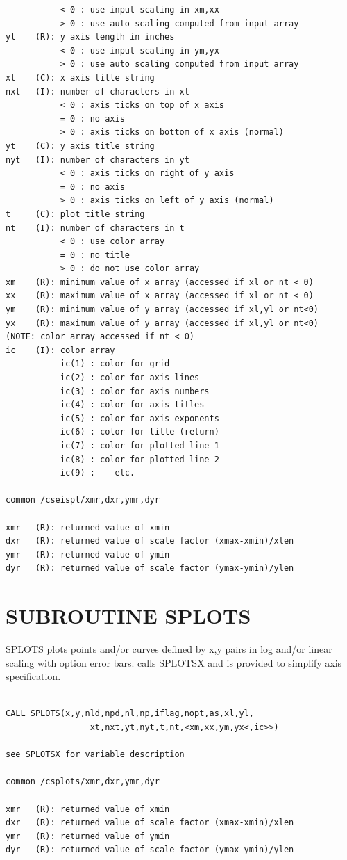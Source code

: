\documentclass[11pt]{report}
\begin{document}
\begin{verbatim}
           < 0 : use input scaling in xm,xx
           > 0 : use auto scaling computed from input array
yl    (R): y axis length in inches
           < 0 : use input scaling in ym,yx
           > 0 : use auto scaling computed from input array
xt    (C): x axis title string
nxt   (I): number of characters in xt
           < 0 : axis ticks on top of x axis
           = 0 : no axis
           > 0 : axis ticks on bottom of x axis (normal)
yt    (C): y axis title string
nyt   (I): number of characters in yt
           < 0 : axis ticks on right of y axis
           = 0 : no axis
           > 0 : axis ticks on left of y axis (normal)
t     (C): plot title string
nt    (I): number of characters in t
           < 0 : use color array
           = 0 : no title
           > 0 : do not use color array
xm    (R): minimum value of x array (accessed if xl or nt < 0)
xx    (R): maximum value of x array (accessed if xl or nt < 0)
ym    (R): minimum value of y array (accessed if xl,yl or nt<0)
yx    (R): maximum value of y array (accessed if xl,yl or nt<0)
(NOTE: color array accessed if nt < 0)
ic    (I): color array
           ic(1) : color for grid
           ic(2) : color for axis lines
           ic(3) : color for axis numbers
           ic(4) : color for axis titles
           ic(5) : color for axis exponents
           ic(6) : color for title (return)
           ic(7) : color for plotted line 1
           ic(8) : color for plotted line 2
           ic(9) :    etc.

common /cseispl/xmr,dxr,ymr,dyr

xmr   (R): returned value of xmin
dxr   (R): returned value of scale factor (xmax-xmin)/xlen
ymr   (R): returned value of ymin
dyr   (R): returned value of scale factor (ymax-ymin)/ylen
\end{verbatim}

\newpage
\section{SUBROUTINE SPLOTS}

SPLOTS plots points and/or curves defined by x,y pairs in log and/or
linear scaling with option error bars.
 calls SPLOTSX and is provided to simplify axis specification.
\begin{verbatim}

CALL SPLOTS(x,y,nld,npd,nl,np,iflag,nopt,as,xl,yl,
                 xt,nxt,yt,nyt,t,nt,<xm,xx,ym,yx<,ic>>)

see SPLOTSX for variable description

common /csplots/xmr,dxr,ymr,dyr

xmr   (R): returned value of xmin
dxr   (R): returned value of scale factor (xmax-xmin)/xlen
ymr   (R): returned value of ymin
dyr   (R): returned value of scale factor (ymax-ymin)/ylen
\end{verbatim}
\end{document}
